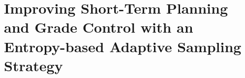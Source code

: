 \chapter{Improving Short-Term Planning and Grade Control with an Entropy-based Adaptive Sampling Strategy}
\label{chapter_PII}





